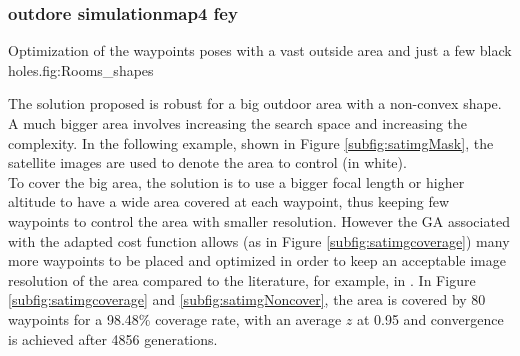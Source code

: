 		


\subsubsection{outdore simulationmap4 fey}\label{fig:Rooms_shapes}
\begin{mfigures}[!]{ Optimization of the waypoints poses with a vast outside area and just a few  black holes.}{fig:Rooms_shapes} \centering
{}
\hspace{1cm}
\hspace{1cm}
\tabsimupose
\end{mfigures}


  
 

The solution proposed is robust for a big outdoor area with a non-convex shape. 
 A much bigger area involves increasing the search space and increasing the complexity. 
In the following example, shown in Figure \ref{subfig:satimgMask}, the satellite images are used to denote the area to control (in white). \\

To cover the big area, the solution is to use a bigger focal length or higher altitude to have a wide area covered at each waypoint, thus keeping few waypoints to control the area with smaller resolution. However the GA associated with the adapted cost function allows  (as in  Figure \ref{subfig:satimgcoverage}) many more waypoints to be placed and optimized in order to keep an acceptable image resolution of the area compared to the literature, for example, in \cite{8*,33*}. In Figure \ref{subfig:satimgcoverage} and \ref{subfig:satimgNoncover}, the area is covered by 80 waypoints for a 98.48$\%$ coverage rate, with an average $z$ at 0.95 and convergence is achieved after 4856 generations. \\
		



 


